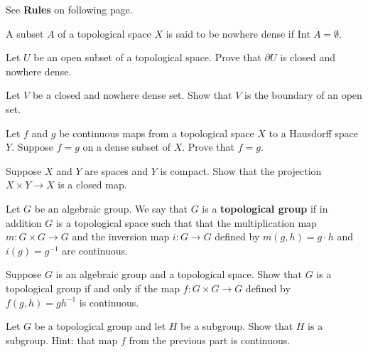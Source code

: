 \documentclass{homework651}
\def\ra{\rightarrow}
\def\Reals{\mathbb{R}}
\begin{document}
See \textbf{Rules} on following page.


\begin{problems}
\problem A subset $A$ of a topological space $X$ is said to be nowhere dense if $\mathrm{Int}\; \overline{A} = \emptyset$.
\begin{subproblems}
\item Let $U$ be an open subset of a topological space. Prove that $\partial U$ is closed and nowhere dense.
\item Let $V$ be a closed and nowhere dense set. Show that $V$ is the boundary of an open set.
\end{subproblems}


\problem Let $f$ and $g$ be continuous maps from a topological space $X$ to a Hausdorff
space $Y$.  Suppose $f=g$ on a dense subset of $X$. Prove that $f=g$. 


\problem Suppose $X$ and $Y$ are spaces and $Y$ is compact.
Show that the projection $X\times Y \to X$ is a closed map.

\problem Let $G$ be an algebraic group.  We say that $G$ is a {\bf topological group}
if in addition $G$ is a topological space
such that that the multiplication
map $m:G\times G\ra G$ and the inversion map $i:G\ra G$ defined by $m(g,h)=g\cdot h$ and $i(g)=g^{-1}$
are continuous.
\begin{subproblems}
\item
Suppose $G$ is an algebraic group and a topological space.  Show that $G$ is a 
topological group if and only if the map $f:G\times G\ra G$ defined by $f(g,h)=g h^{-1}$
is continuous.
\item Let $G$ be a topological group and let $H$ be a subgroup.  Show that $\overline H$ is
a subgroup.  Hint: that map $f$ from the previous part is continuous. 
\end{subproblems}



\end{problems}
\end{document}
